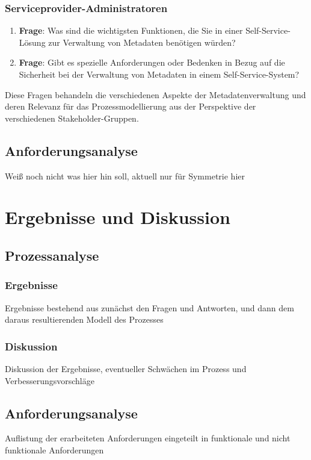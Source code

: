 \documentclass[a4paper, fontsize=12pt]{scrartcl}
\begin{document}
\subsubsection{Serviceprovider-Administratoren}
\begin{enumerate}
    \item \textbf{Frage}: Was sind die wichtigsten Funktionen, die Sie in einer Self-Service-Lösung zur Verwaltung von Metadaten benötigen würden?
    \item \textbf{Frage}: Gibt es spezielle Anforderungen oder Bedenken in Bezug auf die Sicherheit bei der Verwaltung von Metadaten in einem Self-Service-System?
\end{enumerate}

Diese Fragen behandeln die verschiedenen Aspekte der Metadatenverwaltung und deren Relevanz für das Prozessmodellierung aus der Perspektive der verschiedenen Stakeholder-Gruppen.
\subsection{Anforderungsanalyse}\label{subsec:anforderungsanalyse-methodik}
Weiß noch nicht was hier hin soll, aktuell nur für Symmetrie hier

\section{Ergebnisse und Diskussion}\label{sec:results}
\subsection{Prozessanalyse}\label{subsec:prozessanalyse-results}
\subsubsection{Ergebnisse}\label{subsubsec:prozessanalyse-results}
Ergebnisse bestehend aus zunächst den Fragen und Antworten, und dann dem daraus resultierenden Modell des Prozesses
\subsubsection{Diskussion}\label{subsubsec:prozessanalyse-discussion}
Diskussion der Ergebnisse, eventueller Schwächen im Prozess und Verbesserungsvorschläge
\subsection{Anforderungsanalyse}\label{subsec:anforderungsanalyse-results}
Auflistung der erarbeiteten Anforderungen eingeteilt in funktionale und nicht funktionale Anforderungen
\end{document}
